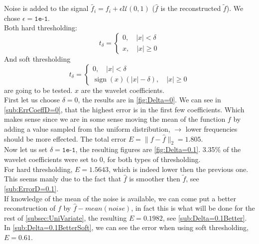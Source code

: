 \documentclass[a4paper]{article}
\DeclareMathOperator*{\sign}{sign}
\begin{document}
	Noise is added to the signal $\tilde{f_i} = f_i + \epsilon \mathcal{U}(0,1)$ ($\hat{f}$ is the reconstructed $\tilde{f}$). We chose $\epsilon = \texttt{1e-1}$. \\
	Both hard thresholding:
	\begin{equation*}
			t_\delta = \begin{cases}
				0, \quad |x| < \delta\\
				x, \quad |x| \ge 0
		\end{cases}
	\end{equation*}
	And soft thresholding
	\begin{equation*}
			t_\delta = \begin{cases}
			0, \quad |x| < \delta\\
			\sign{(x)} (|x|-\delta), \quad |x| \ge 0
	\end{cases}
	\end{equation*}
	are going to be tested. $x$ are the wavelet coefficients.\\
	First let us choose $\delta = 0$, the results are in \cref{fig:Delta=0}. We can see in \cref{sub:ErrCoeffD=0}, that the highest error is in the first few coefficients. Which makes sense since we are in some sense moving the mean of the function $f$ by adding a value sampled from the uniform distribution, $\rightarrow$ lower frequencies should be more effected. The total error $E = \|f-\hat{f}\|_2 = 1.805$.\\
	
	Now let us set $\delta = \texttt{1e-1}$, the resulting figures are \cref{fig:Delta=0.1}. 3.35\% of the wavelet coefficients were set to 0, for both types of thresholding. \\
	For hard thresholding, $E = 1.5643$, which is indeed lower then the previous one. This seems manly due to the fact that $\hat{f}$ is smoother then $\tilde{f}$, see \cref{sub:ErrorD=0.1}. \\
	If knowledge of the mean of the noise is available, we can come put a better reconstruction of $f$ by $\hat{f}-mean(noise)$, in fact this is what will be done for the rest of \cref{subsec:UniVariate}, the resulting $E = 0.1982$, see \cref{sub:Delta=0.1Better}. In \cref{sub:Delta=0.1BetterSoft}, we can see the error when using soft thresholding, $E = 0.61$.
\end{document}

